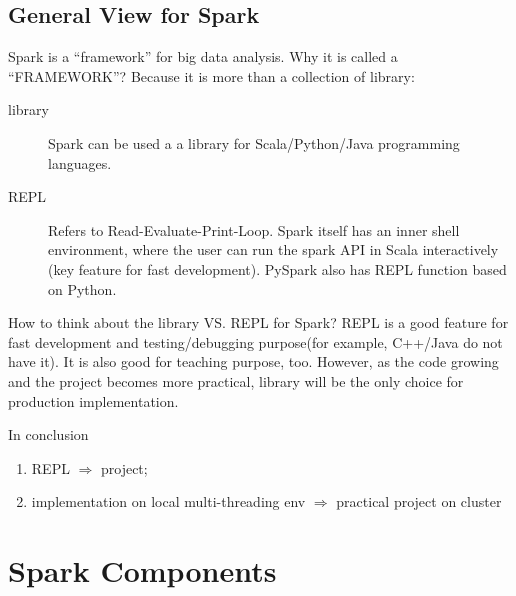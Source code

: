 \documentclass[notheorems, aspectratio=54]{beamer}
\begin{document}

\subsection{General View for Spark}
\begin{frame}

Spark is a ``framework'' for big data analysis. Why it is called a ``FRAMEWORK''? Because it is more than a collection of library:
\begin{description}
 \item [library] Spark can be used a a library for Scala/Python/Java programming languages.
 \item [REPL] Refers to Read-Evaluate-Print-Loop. Spark itself has an inner shell environment, 
 where the user can run the spark API in Scala interactively (key feature for fast development). 
 PySpark also has REPL function based on Python. 
\end{description}

\end{frame}

\begin{frame}

    \begin{block}{How to think about the library VS. REPL for Spark?}
    REPL is a good feature for fast development and testing/debugging purpose(for example, C++/Java do not have it). It is also 
    good for teaching purpose, too. However, as the code growing and the project becomes more practical, library will be the only 
    choice for production implementation.     
    \end{block}
    
    In conclusion
   \begin{enumerate}
    \item  REPL $\Longrightarrow$ project;
    \item  implementation on local multi-threading env $\Longrightarrow$ practical project on cluster
   \end{enumerate}
      
\end{frame}

\section{Spark Components}
\end{document}
